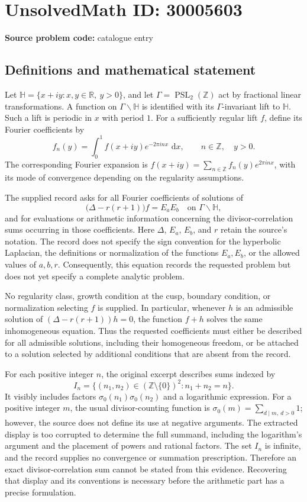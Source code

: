 \documentclass[11pt]{article}
\newcommand{\Z}{\mathbb{Z}}
\newcommand{\R}{\mathbb{R}}
\newcommand{\dd}{\,\mathrm{d}}
\begin{document}
\section*{UnsolvedMath ID: 30005603}
\textbf{Source problem code:} catalogue entry
\subsection{Definitions and mathematical statement}
Let \(\mathbb H=\{x+iy:x,y\in\R,\ y>0\}\), and let \(\Gamma=\operatorname{PSL}_2(\Z)\) act by fractional linear transformations. A function on \(\Gamma\backslash\mathbb H\) is identified with its \(\Gamma\)-invariant lift to \(\mathbb H\). Such a lift is periodic in \(x\) with period \(1\). For a sufficiently regular lift \(f\), define its Fourier coefficients by
\[
 f_n(y)=\int_0^1 f(x+iy)e^{-2\pi i n x}\,\dd x,
 \qquad n\in\Z,\quad y>0.
\]
The corresponding Fourier expansion is \(f(x+iy)=\sum_{n\in\Z}f_n(y)e^{2\pi i n x}\), with its mode of convergence depending on the regularity assumptions.

The supplied record asks for all Fourier coefficients of solutions of
\[
 \bigl(\Delta-r(r+1)\bigr)f=E_aE_b
 \quad\text{on }\Gamma\backslash\mathbb H,
\]
and for evaluations or arithmetic information concerning the divisor-correlation sums occurring in those coefficients. Here \(\Delta\), \(E_a\), \(E_b\), and \(r\) retain the source's notation. The record does not specify the sign convention for the hyperbolic Laplacian, the definitions or normalization of the functions \(E_a,E_b\), or the allowed values of \(a,b,r\). Consequently, this equation records the requested problem but does not yet specify a complete analytic problem.

No regularity class, growth condition at the cusp, boundary condition, or normalization selecting \(f\) is supplied. In particular, whenever \(h\) is an admissible solution of \((\Delta-r(r+1))h=0\), the function \(f+h\) solves the same inhomogeneous equation. Thus the requested coefficients must either be described for all admissible solutions, including their homogeneous freedom, or be attached to a solution selected by additional conditions that are absent from the record.

For each positive integer \(n\), the original excerpt describes sums indexed by
\[
 I_n=\{(n_1,n_2)\in(\Z\setminus\{0\})^2:n_1+n_2=n\}.
\]
It visibly includes factors \(\sigma_0(n_1)\sigma_0(n_2)\) and a logarithmic expression. For a positive integer \(m\), the usual divisor-counting function is \(\sigma_0(m)=\sum_{d\mid m,\ d>0}1\); however, the source does not define its use at negative arguments. The extracted display is too corrupted to determine the full summand, including the logarithm's argument and the placement of powers and rational factors. The set \(I_n\) is infinite, and the record supplies no convergence or summation prescription. Therefore an exact divisor-correlation sum cannot be stated from this evidence. Recovering that display and its conventions is necessary before the arithmetic part has a precise formulation.
\end{document}
